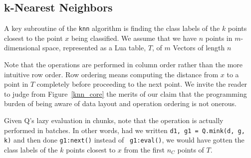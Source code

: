 \subsection{k-Nearest Neighbors}
\label{knn}

A key subroutine of the {\tt knn} algorithm \cite{Hastie2009} is finding the class labels of the
\(k\) points closest to the point \(x\) being classified. 
We assume that we have \(n\) points in \(m\)-dimensional space, represented as a
Lua table, \(T\), of \(m\) Vectors of length \(n\)

Note that the operations are performed in column
order rather than the more intuitive row order. Row ordering means computing the
distance from \(x\) to a point in \(T\) completely before proceeding to the next
point. We invite the reader to judge from Figure~\ref{knn_core} the merits of our claim that the programming burden of being aware of data layout and
operation ordering is not onerous.

Given Q's lazy evaluation in chunks, note that the operation is actually
performed in batches. In other words, had we written 
{\tt d1, g1 = Q.mink(d, g, k)} and then done {\tt g1:next()} instead  of {\tt
g1:eval()}, 
we would have gotten the class labels of the \(k\) points
closest to \(x\) from the first \(n_C\) points of \(T\). 



\begin{figure}[hbtp]
\centering
{}
\end{figure}


